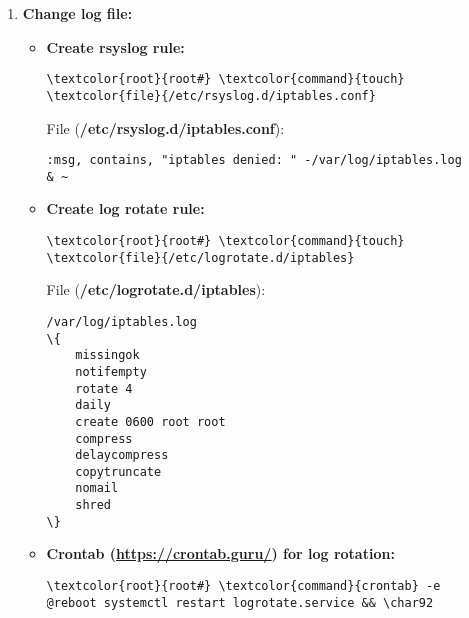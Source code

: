 \documentclass[10pt, a4paper, onecolumn, openany]{book} %
\begin{document}
\begin{enumerate}
\begin{Verbatim}[commandchars=\\\{\}]
\textcolor{root}{root#} \textcolor{command}{ip6tables} -F
\textcolor{root}{root#} \textcolor{command}{ip6tables} -X
\textcolor{root}{root#} \textcolor{command}{ip6tables} -Z
\textcolor{root}{root#} \textcolor{command}{ip6tables} -N LOG_AND_DROP
\textcolor{root}{root#} \textcolor{command}{ip6tables} -A LOG_AND_DROP -j LOG --log-prefix "ip6tables denied: "
--log-level <0-7>
\textcolor{root}{root#} \textcolor{command}{ip6tables} -A LOG_AND_DROP -j DROP 
\textcolor{root}{root#}
\textcolor{root}{root#} \textcolor{command}{ip6tables} -A INPUT -s ::/0 -p icmpv6 --icmpv6-type 128 -j LOG_AND_DROP
\end{Verbatim}
Log File: (\textbf{\textcolor{file}{/var/log/syslog}}).
    \item \textbf{Change log file:}
\begin{itemize}
    \item \textbf{Create rsyslog rule:}
\begin{Verbatim}[commandchars=\\\{\}]
\textcolor{root}{root#} \textcolor{command}{touch} \textcolor{file}{/etc/rsyslog.d/iptables.conf}
\end{Verbatim}    
File (\textbf{\textcolor{file}{/etc/rsyslog.d/iptables.conf}}):
\begin{Verbatim}[commandchars=\\\{\}]
:msg, contains, "iptables denied: " -/var/log/iptables.log
& ~
\end{Verbatim}
    \item \textbf{Create log rotate rule:}
\begin{Verbatim}[commandchars=\\\{\}]
\textcolor{root}{root#} \textcolor{command}{touch} \textcolor{file}{/etc/logrotate.d/iptables}
\end{Verbatim}
File (\textbf{\textcolor{file}{/etc/logrotate.d/iptables}}):
\begin{Verbatim}[commandchars=\\\{\}]
/var/log/iptables.log
\{
    missingok
    notifempty
    rotate 4
    daily
    create 0600 root root
    compress
    delaycompress
    copytruncate
    nomail
    shred
\}
\end{Verbatim}
    \item \textbf{Crontab (\underline{\url{https://crontab.guru/}}) for log rotation:}
\begin{Verbatim}[commandchars=\\\{\}]
\textcolor{root}{root#} \textcolor{command}{crontab} -e
@reboot systemctl restart logrotate.service && \char92

\end{Verbatim}
\end{itemize}
\end{enumerate}
\end{document}
